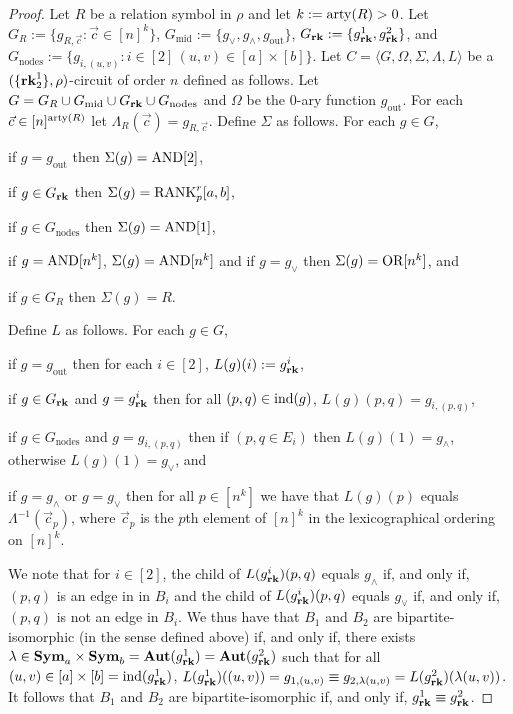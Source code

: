 \documentclass[../paper.tex]{subfiles}
\begin{document}
\begin{proof}
  Let $R$ be a relation symbol in $\rho$ and let $k := \mathrm{arty}(R) > 0$. Let $G_{R}
  := \{g_{R, \vec{c}} : \vec{c} \in [n]^k\}$, $G_{\text{mid}} := \{g_{\lor},
  g_{\land}, g_{\text{out}} \}$, $G_{\text{\textbf{rk}}} : = \{ g^1_{\text{\textbf{rk}}}, g^2_{\text{\textbf{rk}}}\}$,
  and $G_{\text{nodes}} := \{g_{i, (u,v)} : i \in [2] \, (u,v) \in [a] \times
  [b] \}$. Let $C = \langle G, \Omega, \Sigma, \Lambda, L \rangle$ be a
  $(\{\text{\textbf{rk}}^{1}_2\}, \rho)$-circuit of order $n$ defined as follows. Let $G =
  G_R \cup G_{\text{mid}} \cup G_{\text{\textbf{rk}}} \cup G_{\text{nodes}}$ and $\Omega$ be
  the $0$-ary function $g_{\text{out}}$. For each $\vec{c} \in
  [n]^{\mathrm{arty}(R)}$ let $\Lambda_R(\vec{c}) = g_{R, \vec{c}}$. Define $\Sigma$ as
  follows. For each $g \in G$,
  \begin{myitemize}
  \item if $g = g_{\text{out}}$ then $\Sigma(g) = \text{\upshape AND}[2]$,
  \item if $g \in G_{\text{\textbf{rk}}}$ then $\Sigma(g) = \text{\upshape RANK}^r_p [a,b]$,
  \item if $g \in G_{\text{nodes}}$ then $\Sigma(g) = \text{\upshape AND}[1]$,
  \item if $g = \text{\upshape AND}[n^k]$, $\Sigma (g) = \text{\upshape AND}[n^k]$ and if $g = g_{\lor}$
    then $\Sigma(g) = \text{\upshape OR}[n^k]$, and
  \item if $g \in G_R$ then $\Sigma(g) = R$.
  \end{myitemize}
  Define $L$ as follows. For each $g \in G$,
  \begin{myitemize}
    \setlength\itemsep{0mm}
  \item if $g = g_{\text{out}}$ then for each $i \in [2]$, $L(g)(i) :=
    g^i_{\text{\textbf{rk}}}$,
  \item if $g \in G_{\text{\textbf{rk}}}$ and $g = g^i_{\text{\textbf{rk}}}$ then for all $(p,q) \in
    \text{\upshape ind}(g)$, $L(g)(p,q) = g_{i, (p,q)}$,
  \item if $g \in G_{\text{nodes}}$ and $g = g_{i, (p,q)}$ then if $(p, q \in
    E_i)$ then $L(g)(1) = g_{\land}$, otherwise $L(g)(1) = g_\lor$, and
  \item if $g = g_\land$ or $g = g_\lor$ then for all $p \in [n^k]$ we have that
    $L(g)(p)$ equals $\Lambda^{-1}(\vec{c}_p)$, where $\vec{c}_p$ is the $p$th
    element of $[n]^k$ in the lexicographical ordering on $[n]^k$.
  \end{myitemize}

  We note that for $i \in [2]$, the child of $L(g^i_{\text{\textbf{rk}}})(p,q)$ equals
  $g_\land$ if, and only if, $(p,q)$ is an edge in in $B_i$ and the child of
  $L(g^i_{\text{\textbf{rk}}})(p,q) $ equals $g_\lor$ if, and only if, $(p,q)$ is not an edge
  in $B_i$. We thus have that $B_1$ and $B_2$ are bipartite-isomorphic (in the
  sense defined above) if, and only if, there exists $\lambda \in \text{\textbf{Sym}}_{a}
  \times \text{\textbf{Sym}}_{b} = \text{\textbf{Aut}}(g^1_{\text{\textbf{rk}}}) = \text{\textbf{Aut}}(g^2_{\text{\textbf{rk}}})$ such that for all
  $(u,v) \in [a] \times [b] = \text{\upshape ind}(g^1_{\text{\textbf{rk}}})$, $L(g^1_{\text{\textbf{rk}}})((u,v)) = g_{1,
    (u,v)} \equiv g_{2, \lambda (u,v)} = L(g^2_{\text{\textbf{rk}}})(\lambda (u,v))$. It
  follows that $B_1$ and $B_2$ are bipartite-isomorphic if, and only if,
  $g^1_{\text{\textbf{rk}}} \equiv g^2_{\text{\textbf{rk}}}$.


\end{proof}
\end{document}
